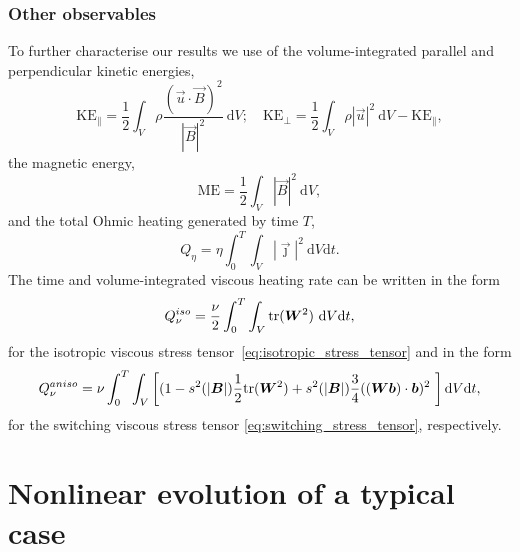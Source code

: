 \subsubsection{Other observables}

To further characterise our results we use of the volume-integrated parallel and perpendicular kinetic energies,
\begin{equation}
  \label{eq:kinetic_energies}
  \text{KE}_{\parallel} = \frac{1}{2} \int_V \rho\frac{(\vec{u}\cdot\vec{B})^2}{|\vec{B}|^2}\ \text{d}V; \quad
  \text{KE}_{\perp} = \frac{1}{2} \int_V \rho|\vec{u}|^2\ \text{d}V - \text{KE}_{\parallel},
\end{equation}
the magnetic energy,
\begin{equation}
  \label{eq:magnetic_energy}
   \text{ME} = \frac12\int_V |\vec{B}|^2\ \text{d}V,
\end{equation}
and the total Ohmic heating generated by time $T$,
\begin{equation}
  \label{eq:ohmic_heating}
  Q_{\eta} = \eta \int_0^{T} \int_V |\vec{\jmath}|^2\ \text{d}V \text{d}t.
\end{equation}
The time and volume-integrated viscous heating rate can be written
in the form
\begin{equation}
  \label{eq:iso_viscous_heating}
  Q_{\nu}^{iso} = \frac{\nu}{2} \int_0^T \int_V
  \text{tr}({\bm W}^2)\  \text{d}V \text{d}t,
\end{equation}
for the isotropic viscous stress
tensor~\eqref{eq:isotropic_stress_tensor} and in the form
\begin{equation}
  \label{eq:aniso_viscous_heating}
  Q_{\nu}^{aniso} = \nu \int_0^T \int_V \left[ (1-s^2(|{\bm B}|)\frac{1}{2}\text{tr}({\bm W}^2) + s^2(|{\bm B}|)\frac{3 }{4} (({\bm W} {\bm b}) \cdot {\bm b})^2\ \right] \text{d}V \text{d}t,
\end{equation}
for the switching viscous stress tensor \eqref{eq:switching_stress_tensor}, respectively.

\section{Nonlinear evolution of a typical case}
\label{sec:results}

